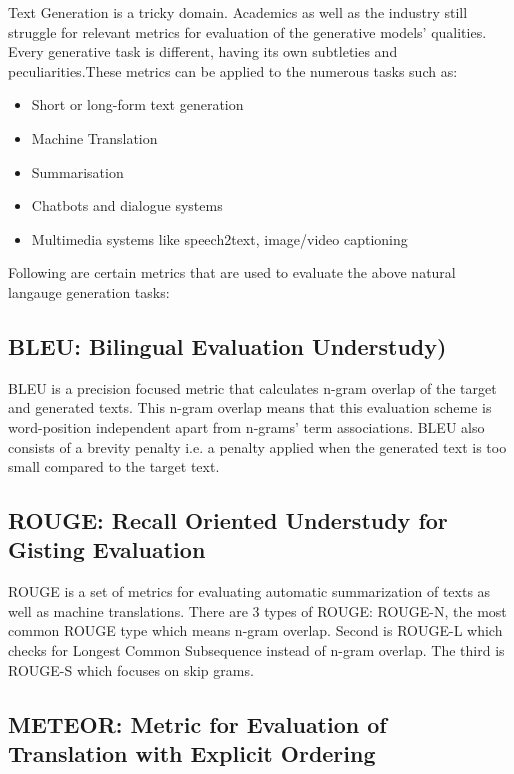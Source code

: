 Text Generation is a tricky domain. Academics as well as the industry still struggle for relevant metrics for evaluation of the generative models' qualities. Every generative task is different, having its own subtleties and peculiarities.These metrics can be applied to the numerous tasks such as:
\begin{itemize}
	\item Short or long-form text generation
	\item Machine Translation
	\item Summarisation
	\item Chatbots and dialogue systems
	\item Multimedia systems like speech2text, image/video captioning
\end{itemize}
Following are certain metrics that are used to evaluate the above natural langauge generation tasks:

\subsection{BLEU: Bilingual Evaluation Understudy)}

\par BLEU \cite{bleu} is a precision focused metric that calculates n-gram overlap of the target and generated texts. This n-gram overlap means that this evaluation scheme is word-position independent apart from n-grams' term associations. BLEU also consists of a brevity penalty i.e. a penalty applied when the generated text is too small compared to the target text.


\subsection{ROUGE: Recall Oriented Understudy for Gisting Evaluation}

\par ROUGE \cite{rouge} is a set of metrics for evaluating automatic summarization of texts as well as machine translations. There are 3 types of ROUGE: ROUGE-N, the most common ROUGE type which means n-gram overlap. Second is ROUGE-L which checks for Longest Common Subsequence instead of n-gram overlap. The third is ROUGE-S which focuses on skip grams.


\subsection{METEOR: Metric for Evaluation of Translation with Explicit Ordering}

